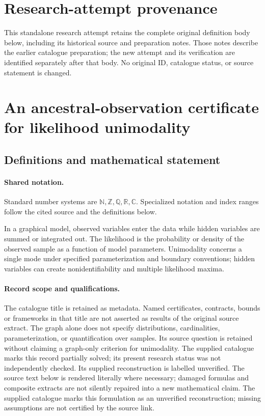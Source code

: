 \documentclass[11pt]{article}
\begin{document}
\section*{Research-attempt provenance}
This standalone research attempt retains the complete original definition body below,
including its historical source and preparation notes. Those notes describe the
earlier catalogue preparation; the new attempt and its verification are identified
separately after that body. No original ID, catalogue status, or source statement is changed.

\section{An ancestral-observation certificate for likelihood unimodality}\label{statement}

\subsection{Definitions and mathematical statement}

\paragraph{Shared notation.}Standard number systems are $\mathbb N,\mathbb Z,\mathbb Q,\mathbb R,\mathbb C$. Specialized notation and index ranges follow the cited source and the definitions below.


In a graphical model, observed variables enter the data while hidden variables are summed or integrated out. The likelihood is the probability or density of the observed sample as a function of model parameters. Unimodality concerns a single mode under specified parameterization and boundary conventions; hidden variables can create nonidentifiability and multiple likelihood maxima.
\paragraph{Record scope and qualifications.}
The catalogue title is retained as metadata. Named certificates, contracts, bounds or frameworks in that title are not asserted as results of the original source extract.
The graph alone does not specify distributions, cardinalities, parameterization, or quantification over samples. Its source question is retained without claiming a graph-only criterion for unimodality. The supplied catalogue marks this record partially solved; its present research status was not independently checked. Its supplied reconstruction is labelled unverified.
The source text below is rendered literally where necessary; damaged formulas and composite extracts are not silently repaired into a new mathematical claim.
The supplied catalogue marks this formulation as an unverified reconstruction; missing assumptions are not certified by the source link.
\end{document}
